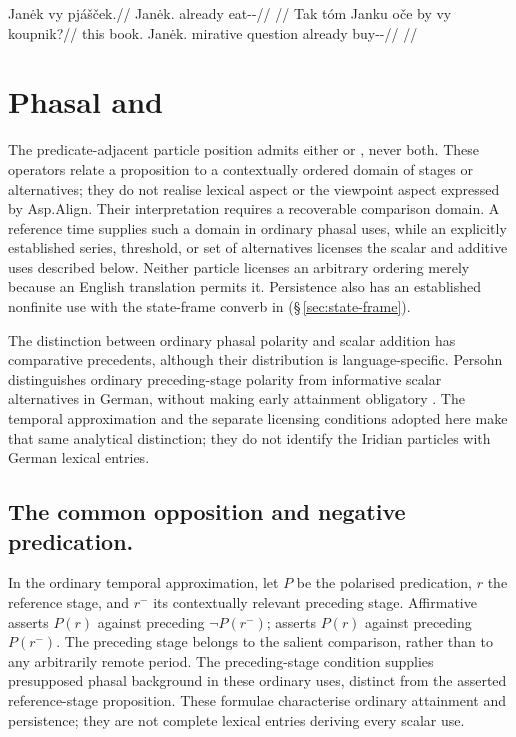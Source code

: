 \pex
\a
\begingl
\gla Janėk vy pjášček.//
\glb Janėk.\Dir{} already eat-\Antip{}-\Pf{}//
\glft {}//
\endgl
\a
\begingl
\gla Tak tóm Janku oče by vy koupnik?//
\glb this book.\Dir{} Janėk.\Trs{} mirative question already buy-\Trs{}-\Pf{}//
\glft {}//
\endgl
\xe

\section{Phasal  and }\label{sec:class1-particles}

The predicate-adjacent particle position admits either  or ,
never both. These operators relate a proposition to a contextually ordered
domain of stages or alternatives; they do not realise lexical aspect or the
viewpoint aspect expressed by Asp.Align. Their interpretation requires a recoverable
comparison domain. A reference time supplies such a domain in ordinary phasal
uses, while an explicitly established series, threshold, or set of alternatives
licenses the scalar and additive uses described below. Neither particle
licenses an arbitrary ordering merely because an English translation permits it.
Persistence also has an established nonfinite use with the state-frame converb
in   (§\,\ref{sec:state-frame}).

The distinction between ordinary phasal polarity and scalar addition has
comparative precedents, although their distribution is language-specific.
Persohn distinguishes ordinary preceding-stage polarity from informative
scalar alternatives in German, without making early attainment obligatory
\cite[§§2.1--2.2, 6]{persohn2024scalar}. The temporal approximation and the
separate licensing conditions adopted here make that same analytical distinction;
they do not identify the Iridian particles with German lexical entries.

\subsection{The common opposition and negative predication.}
In the ordinary temporal approximation, let $P$ be the polarised predication,
$r$ the reference stage, and $r^{-}$ its contextually relevant preceding stage.
Affirmative  asserts $P(r)$ against preceding $\neg P(r^{-})$;
 asserts $P(r)$ against preceding $P(r^{-})$. The preceding stage
belongs to the salient comparison, rather than to any arbitrarily remote
period. The preceding-stage condition supplies presupposed phasal background in
these ordinary uses, distinct from the asserted reference-stage proposition.
These formulae characterise ordinary attainment and persistence;
they are not complete lexical entries deriving every scalar use.

